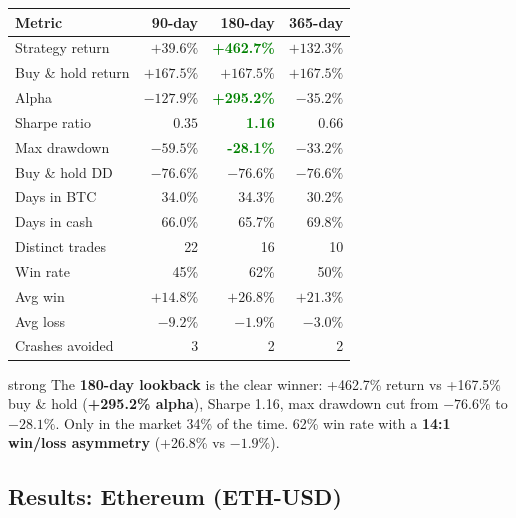 \documentclass[11pt,a4paper]{article}
\begin{document}
\vspace{0.5em}
\begin{tabular}{@{}lrrr@{}}
    \toprule
    \textbf{Metric} & \textbf{90-day} & \textbf{180-day} & \textbf{365-day} \\
    \midrule
    Strategy return    & $+39.6\%$  & \textcolor{green}{\textbf{+462.7\%}} & $+132.3\%$ \\
    Buy \& hold return & $+167.5\%$ & $+167.5\%$  & $+167.5\%$ \\
    Alpha              & $-127.9\%$ & \textcolor{green}{\textbf{+295.2\%}} & $-35.2\%$  \\
    \midrule
    Sharpe ratio       & $0.35$     & \textcolor{green}{\textbf{1.16}}     & $0.66$     \\
    Max drawdown       & $-59.5\%$  & \textcolor{green}{\textbf{-28.1\%}}  & $-33.2\%$  \\
    Buy \& hold DD     & $-76.6\%$  & $-76.6\%$ & $-76.6\%$ \\
    \midrule
    Days in BTC        & 34.0\%     & 34.3\%     & 30.2\%     \\
    Days in cash       & 66.0\%     & 65.7\%     & 69.8\%     \\
    Distinct trades    & 22         & 16         & 10         \\
    Win rate           & 45\%       & 62\%       & 50\%       \\
    Avg win            & $+14.8\%$  & $+26.8\%$  & $+21.3\%$  \\
    Avg loss           & $-9.2\%$   & $-1.9\%$   & $-3.0\%$   \\
    Crashes avoided    & 3          & 2          & 2          \\
    \bottomrule
\end{tabular}

\vspace{1em}

\begin{resultbox}{strong}
The \textbf{180-day lookback} is the clear winner:
+462.7\% return vs +167.5\% buy \& hold (\textbf{+295.2\% alpha}),
Sharpe 1.16, max drawdown cut from $-76.6\%$ to $-28.1\%$.
Only in the market 34\% of the time. 62\% win rate with a
\textbf{14:1 win/loss asymmetry} (+26.8\% vs $-1.9\%$).
\end{resultbox}

\subsection{Results: Ethereum (ETH-USD)}
\end{document}
